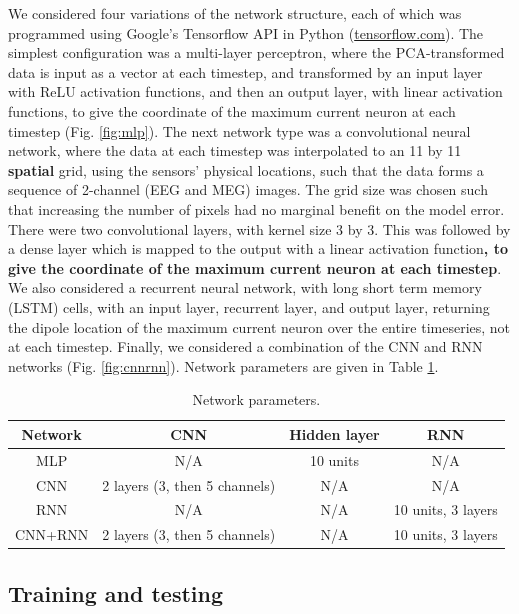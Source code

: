 \documentclass[journal]{IEEEtran}
\begin{document}
We considered four variations of the network structure, each of which was programmed using Google's Tensorflow API in Python (\url{tensorflow.com}). The simplest configuration was a multi-layer perceptron, where the PCA-transformed data is input as a vector at each timestep, and transformed by an input layer with ReLU activation functions, and then an output layer, with linear activation functions, to give the coordinate of the maximum current neuron at each timestep (Fig. \ref{fig:mlp}). The next network type was a convolutional neural network, where the data at each timestep was interpolated to an 11 by 11 \textbf{spatial} grid, using the sensors' physical locations, such that the data forms a sequence of 2-channel (EEG and MEG) images. The grid size was chosen such that increasing the number of pixels had no marginal benefit on the model error. There were two convolutional layers, with kernel size 3 by 3. This was followed by a dense layer which is mapped to the output with a linear activation function\textbf{, to give the coordinate of the maximum current neuron at each timestep}. We also considered a recurrent neural network, with long short term memory (LSTM) cells, with an input layer, recurrent layer, and output layer, returning the dipole location of the maximum current neuron over the entire timeseries, not at each timestep. Finally, we considered a combination of the CNN and RNN networks (Fig. \ref{fig:cnnrnn}). Network parameters are given in Table \ref{tab:params}. 

\begin{table}[h!]
  \centering
  \begin{tabular}{c||c|c|c}
    \hline
    Network & CNN & Hidden layer & RNN\\
    \hline
    \hline
    MLP & N/A & 10 units & N/A \\
    \hline
    CNN & 2 layers (3, then 5 channels) & N/A & N/A \\
    \hline
    RNN & N/A & N/A & 10 units, 3 layers \\
    \hline
    CNN+RNN & 2 layers (3, then 5 channels) &  N/A & 10 units, 3 layers \\
  \end{tabular}
  \caption{Network parameters.}
  \label{tab:params}
\end{table}


\subsection{Training and testing}
\end{document}
